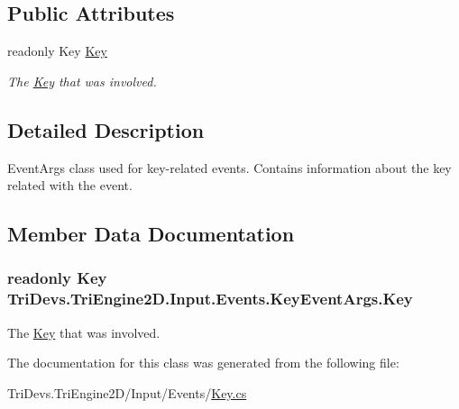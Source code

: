 \subsection*{Public Attributes}
\begin{DoxyCompactItemize}
\item 
readonly Key \hyperlink{class_tri_devs_1_1_tri_engine2_d_1_1_input_1_1_events_1_1_key_event_args_ab638c2e9bec6dacfc7bea7ca32b84fdf}{Key}
\begin{DoxyCompactList}\small\item\em The \hyperlink{class_tri_devs_1_1_tri_engine2_d_1_1_input_1_1_events_1_1_key_event_args_ab638c2e9bec6dacfc7bea7ca32b84fdf}{Key} that was involved. \end{DoxyCompactList}\end{DoxyCompactItemize}


\subsection{Detailed Description}
Event\-Args class used for key-\/related events. Contains information about the key related with the event. 



\subsection{Member Data Documentation}
\hypertarget{class_tri_devs_1_1_tri_engine2_d_1_1_input_1_1_events_1_1_key_event_args_ab638c2e9bec6dacfc7bea7ca32b84fdf}{
\subsubsection[{Key}]{\setlength{\rightskip}{0pt plus 5cm}readonly Key Tri\-Devs.\-Tri\-Engine2\-D.\-Input.\-Events.\-Key\-Event\-Args.\-Key}}\label{class_tri_devs_1_1_tri_engine2_d_1_1_input_1_1_events_1_1_key_event_args_ab638c2e9bec6dacfc7bea7ca32b84fdf}


The \hyperlink{class_tri_devs_1_1_tri_engine2_d_1_1_input_1_1_events_1_1_key_event_args_ab638c2e9bec6dacfc7bea7ca32b84fdf}{Key} that was involved. 



The documentation for this class was generated from the following file\-:\begin{DoxyCompactItemize}
\item 
Tri\-Devs.\-Tri\-Engine2\-D/\-Input/\-Events/\hyperlink{_key_8cs}{Key.\-cs}\end{DoxyCompactItemize}
